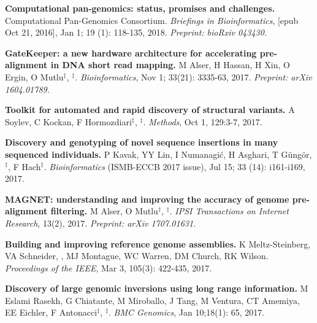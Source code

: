 \vspace{-.2cm}        
    {\bf Computational pan-genomics: status, promises and challenges.}
    Computational Pan-Genomics Consortium. {\em Briefings in Bioinformatics}, [epub Oct 21, 2016], Jan 1; 19 (1): 118-135, 2018.
    \textit{Preprint: bioRxiv 043430.}
         
\vspace{-.2cm}      
    {\bf GateKeeper: a new hardware architecture for accelerating pre-alignment in DNA short read mapping.}
    M Alser, H Hassan, H Xin, O Ergin, O Mutlu$^\ddag$, \calkan{}$^\ddag$.
    {\em Bioinformatics}, Nov 1; 33(21): 3335-63, 2017. \textit{Preprint: arXiv 1604.01789.}

\vspace{-.2cm}
    {\bf Toolkit for automated and rapid discovery of structural variants.}
    A Soylev, C Kockan, F Hormozdiari$^\ddag$, \calkan{}$^\ddag$.
    {\em Methods}, Oct 1, 129:3-7, 2017.
    
\vspace{-.2cm}
    {\bf Discovery and genotyping of novel sequence insertions in many sequenced individuals.}
    P Kavak, YY Lin, I Numanagić, H Asghari, T Güngör, \calkan{}$^\ddag$, F Hach$^\ddag$.
    {\em Bioinformatics} (ISMB-ECCB 2017 issue), Jul 15; 33 (14): i161-i169, 2017.\\
         
\vspace{-.2cm}
    {\bf MAGNET: understanding and improving the accuracy of genome pre-alignment filtering.}
    M Alser, O Mutlu$^\ddag$, \calkan{}$^\ddag$. 
    {\em IPSI Transactions on Internet Research}, 13(2), 2017. \textit{Preprint: arXiv 1707.01631.}
     
\vspace{-.2cm}        
    {\bf Building and improving reference genome assemblies.} K Meltz-Steinberg, VA Schneider, \calkan{}, MJ Montague, WC Warren, DM Church, RK Wilson.
    {\em Proceedings of the IEEE}, Mar 3, 105(3): 422-435, 2017.

\vspace{-.2cm}        
    {\bf Discovery of large genomic inversions using long range information.} M Eslami Rasekh, G Chiatante, M Miroballo, J Tang, M Ventura, CT Amemiya, EE Eichler, F Antonacci$^\ddag$, \calkan{}$^\ddag$.
    {\em BMC Genomics}, Jan 10;18(1): 65, 2017.

